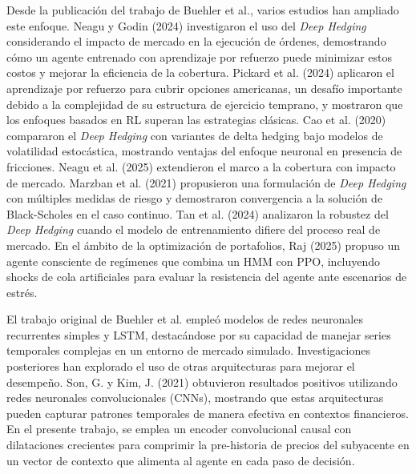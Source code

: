 \documentclass[11pt,a4paper,spanish]{article}
\numberwithin{equation}{section} %
\begin{document}
Desde la publicación del trabajo de Buehler et al., varios estudios han ampliado este enfoque. Neagu y Godin (2024) investigaron el uso del \textit{Deep Hedging} considerando el impacto de mercado en la ejecución de órdenes, demostrando cómo un agente entrenado con aprendizaje por refuerzo puede minimizar estos costos y mejorar la eficiencia de la cobertura. Pickard et al. (2024) aplicaron el aprendizaje por refuerzo para cubrir opciones americanas, un desafío importante debido a la complejidad de su estructura de ejercicio temprano, y mostraron que los enfoques basados en RL superan las estrategias clásicas. Cao et al. (2020) compararon el \textit{Deep Hedging} con variantes de delta hedging bajo modelos de volatilidad estocástica, mostrando ventajas del enfoque neuronal en presencia de fricciones. Neagu et al. (2025) extendieron el marco a la cobertura con impacto de mercado. Marzban et al. (2021) propusieron una formulación de \textit{Deep Hedging} con múltiples medidas de riesgo y demostraron convergencia a la solución de Black-Scholes en el caso continuo. Tan et al. (2024) analizaron la robustez del \textit{Deep Hedging} cuando el modelo de entrenamiento difiere del proceso real de mercado. En el ámbito de la optimización de portafolios, Raj (2025) propuso un agente consciente de regímenes que combina un HMM con PPO, incluyendo shocks de cola artificiales para evaluar la resistencia del agente ante escenarios de estrés.

El trabajo original de Buehler et al. empleó modelos de redes neuronales recurrentes simples y LSTM, destacándose por su capacidad de manejar series temporales complejas en un entorno de mercado simulado. Investigaciones posteriores han explorado el uso de otras arquitecturas para mejorar el desempeño. Son, G. y Kim, J. (2021) obtuvieron resultados positivos utilizando redes neuronales convolucionales (CNNs), mostrando que estas arquitecturas pueden capturar patrones temporales de manera efectiva en contextos financieros. En el presente trabajo, se emplea un encoder convolucional causal con dilataciones crecientes para comprimir la pre-historia de precios del subyacente en un vector de contexto que alimenta al agente en cada paso de decisión.
\end{document}
